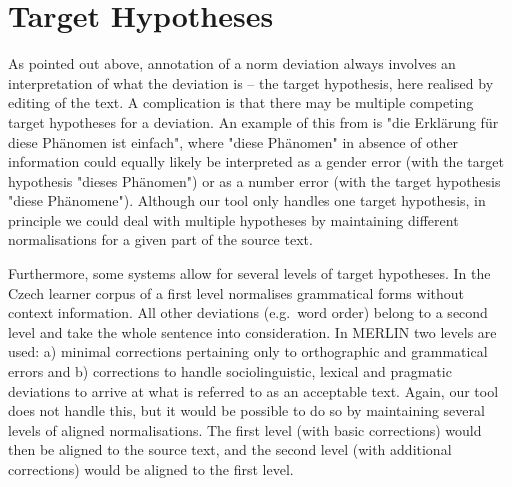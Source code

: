 \documentclass[10pt, a4paper]{article}
\newcommand{\dan}[1]{{\color{Fuchsia}{Dan: #1}}}
\newcommand{\elena}[1]{{\color{BrickRed}{Elena: #1}}}
\newcommand{\mats}[1]{{\color{Blue}{Mats: #1}}}
\newcommand{\normAnn}[0]{our tool }
\begin{document}
\section{Target Hypotheses}
\label{sec:targethypothesis}





As pointed out above, annotation of a norm deviation always involves an interpretation of what the deviation is -- the target hypothesis, here realised by editing of the text. A complication is that there may be multiple competing target hypotheses for a deviation. An example of this from  is "die Erklärung für diese Phänomen ist einfach", where "diese Ph{\"a}nomen" in absence of other information could equally likely be interpreted as a gender error (with the target hypothesis "dieses Ph{\"a}nomen") or as a number error (with the target hypothesis "diese Ph{\"a}nomene"). Although \normAnn only handles one target hypothesis, in principle we could deal with multiple hypotheses by maintaining different normalisations for a given part of the source text.

Furthermore, some systems allow for several levels of target hypotheses. In the Czech learner corpus of  a first level normalises grammatical forms without context information. All other deviations (e.g.\ word order) belong to a second level and take the whole sentence into consideration.
In MERLIN \cite{MERLIN2014} two levels are used: a) minimal corrections pertaining only to orthographic and grammatical errors and b) corrections to handle sociolinguistic, lexical and pragmatic deviations to arrive at what is referred to as an acceptable text. Again, \normAnn does not handle this, but it would be possible to do so by maintaining several levels of aligned normalisations. The first level (with basic corrections) would then be aligned to the source text, and the second level (with additional corrections) would be aligned to the first level.
\end{document}
